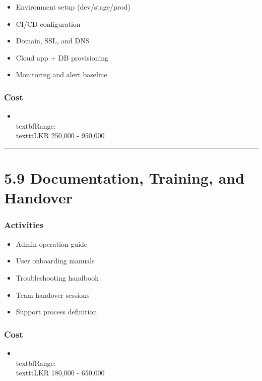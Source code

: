 \documentclass[11pt,a4paper]{article}
\begin{document}
\begin{itemize}
\item Environment setup (dev/stage/prod)
\item CI/CD configuration
\item Domain, SSL, and DNS
\item Cloud app + DB provisioning
\item Monitoring and alert baseline
\end{itemize}

\subsubsection{Cost}

\begin{itemize}
\item \\textbf{Range:} \\texttt{LKR 250,000 - 950,000}
\end{itemize}

\bigskip\hrule\bigskip

\section{5.9 Documentation, Training, and Handover}

\subsubsection{Activities}

\begin{itemize}
\item Admin operation guide
\item User onboarding manuals
\item Troubleshooting handbook
\item Team handover sessions
\item Support process definition
\end{itemize}

\subsubsection{Cost}

\begin{itemize}
\item \\textbf{Range:} \\texttt{LKR 180,000 - 650,000}
\end{itemize}
\end{document}
